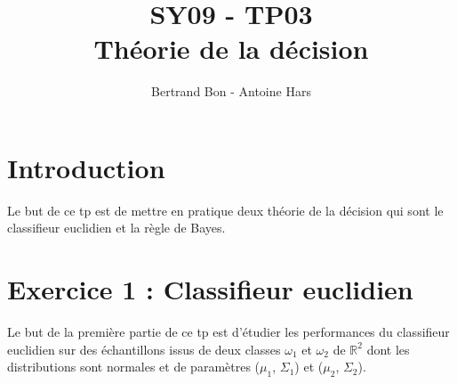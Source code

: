 \documentclass[a4paper, 10pt]{article}
\title{SY09 - TP03\\Théorie de la décision}
\author{Bertrand Bon - Antoine Hars}
\begin{document}
\maketitle

\section*{Introduction}
Le but de ce tp est de mettre en pratique deux théorie de la décision qui sont le classifieur euclidien et la règle de Bayes.\\

\section*{Exercice 1 : Classifieur euclidien}
Le but de la première partie de ce tp est d'étudier les performances du classifieur euclidien sur des échantillons issus
de deux classes $\omega_{1}$ et $\omega_{2}$ de $\mathbb{R}^{2}$ dont les distributions sont normales et de paramètres
($\mu_{1}$, $\Sigma_{1}$) et ($\mu_{2}$, $\Sigma_{2}$).\\
\end{document}
